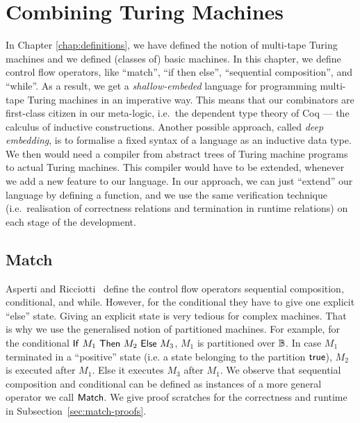 \chapter{Combining Turing Machines}
\label{chap:combining}

In Chapter \ref{chap:definitions}, we have defined the notion of multi-tape Turing machines and we defined (classes of) basic machines.  In this
chapter, we define control flow operators, like ``match'', ``if then else'', ``sequential composition'', and ``while''.  As a result, we get a
\emph{shallow-embeded} language for programming multi-tape Turing machines in an imperative way.  This means that our combinators are first-class
citizen in our meta-logic, i.e.\ the dependent type theory of Coq --- the calculus of inductive constructions.  Another possible approach, called
\emph{deep embedding}, is to formalise a fixed syntax of a language as an inductive data type.  We then would need a compiler from abstract
trees of Turing machine programs to actual Turing machines.  This compiler would have to be extended, whenever we add a new feature to our language.
In our approach, we can just ``extend'' our language by defining a function, and we use the same verification technique (i.e.\ realisation of
correctness relations and termination in runtime relations) on each stage of the development.


\section{Match}
\label{sec:match}

Asperti and Ricciotti~\cite{asperti2015} define the control flow operators sequential composition, conditional, and while.  However, for the
conditional they have to give one explicit ``else'' state.  Giving an explicit state is very tedious for complex machines.  That is why we use the
generalised notion of partitioned machines.  For example, for the conditional $\mathsf{If}~M_1~\mathsf{Then}~M_2~\mathsf{Else}~M_3$, $M_1$ is partitioned over $\mathbb{B}$.  In case $M_1$
terminated in a ``positive'' state (i.e. a state belonging to the partition $\mathsf{true}$), $M_2$ is executed after $M_1$.  Else it executes $M_3$ after
$M_1$.  We observe that sequential composition and conditional can be defined as instances of a more general operator we call $\mathsf{Match}$.  We give
proof scratches for the correctness and runtime in Subsection~\ref{sec:match-proofs}.

